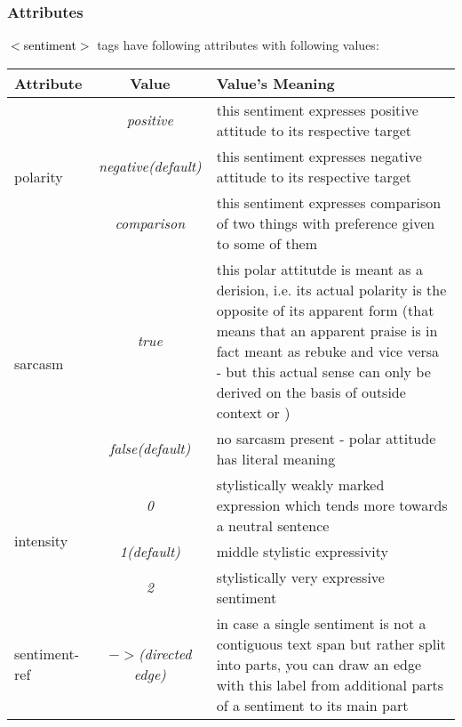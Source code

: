 \documentclass[11pt,a4paper]{article}
\newcommand{\xmltag}[1]{\textcolor{black}{{\small$<$#1$>$}}}
\begin{document}
\subsubsection{Attributes}
\xmltag{sentiment} tags have following attributes with following
values:

\begin{tabular}{|l|c|p{}|}\hline
  Attribute & Value & Value's Meaning\\\hline

  \multirow{3}{*}{polarity} & \textit{positive} & this sentiment
  expresses positive attitude to its respective target\\\cline{2-3}

  & \textit{negative\newline(default)} & this sentiment
  expresses negative attitude to its respective target\\\cline{2-3}

  & \textit{comparison} & this sentiment expresses comparison of two
  things with preference given to some of them\\\hline

  \multirow{2}{*}{sarcasm} & \textit{true} & this polar attitutde is
  meant as a derision, i.e. its actual polarity is the opposite of its
  apparent form (that means that an apparent praise is in fact meant
  as rebuke and vice versa - but this actual sense can only be
  derived on the basis of outside context or )\\\cline{2-3}

  & \textit{false\newline(default)} & no sarcasm present - polar
  attitude has literal meaning\\\hline

  \multirow{3}{*}{intensity} & \textit{0} & stylistically weakly
  marked expression which tends more towards a neutral
  sentence\\\cline{2-3}

  & \textit{1\newline(default)} & middle stylistic
  expressivity\\\cline{2-3}

  & \textit{2} & stylistically very expressive sentiment\\\hline

  sentiment-ref & \textit{$->$\newline(directed edge)} & in case a
  single sentiment is not a contiguous text span but rather split into
  parts, you can draw an edge with this label from additional parts of
  a sentiment to its main part\\\hline
\end{tabular}
\end{document}
